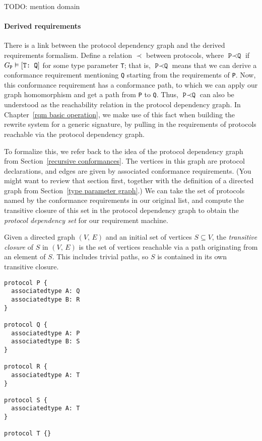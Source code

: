 \documentclass[../generics]{subfiles}
\begin{document}
TODO: mention domain

\paragraph{Derived requirements}
There is a link between the protocol dependency graph and the derived requirements formalism. Define a relation \index{$\prec$}$\prec$ between protocols, where $\texttt{P}\prec\texttt{Q}$ if $G_\texttt{P}\vDash[\texttt{T:~Q}]$ for some type parameter \texttt{T}; that is, $\texttt{P}\prec\texttt{Q}$ means that we can derive a conformance requirement mentioning \texttt{Q} starting from the requirements of \texttt{P}. Now, this conformance requirement has a conformance path, to which we can apply our graph homomorphism and get a path from \texttt{P} to \texttt{Q}. Thus, $\texttt{P}\prec\texttt{Q}$ can also be understood as the reachability relation in the protocol dependency graph. In Chapter~\ref{rqm basic operation}, we make use of this fact when building the rewrite system for a generic signature, by pulling in the requirements of protocols reachable via the protocol dependency graph.

%
%
To formalize this, we refer back to the idea of the protocol dependency graph from Section~\ref{recursive conformances}. The vertices in this graph are protocol declarations, and edges are given by associated conformance requirements. (You might want to review that section first, together with the definition of a directed graph from Section~\ref{type parameter graph}.) We can take the set of protocols named by the conformance requirements in our original list, and compute the transitive closure of this set in the protocol dependency graph to obtain the \emph{protocol dependency set} for our requirement machine.

%
\begin{definition} Given a directed graph $(V,\, E)$ and an initial set of vertices $S\subseteq V$, the \emph{transitive closure} of $S$ in $(V,\, E)$ is the set of vertices reachable via a path originating from an element of $S$. This includes trivial paths, so $S$ is contained in its own transitive closure.
\end{definition}

\begin{listing}\label{protocol component listing}
\begin{Verbatim}
protocol P {
  associatedtype A: Q
  associatedtype B: R
}

protocol Q {
  associatedtype A: P
  associatedtype B: S
}

protocol R {
  associatedtype A: T
}

protocol S {
  associatedtype A: T
}

protocol T {}
\end{Verbatim}
\end{listing}
\end{document}
